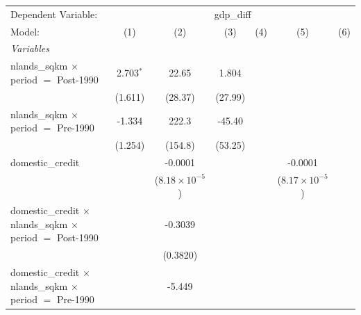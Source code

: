 \begingroup
\centering
\begin{tabular}{lcccccc}
   \tabularnewline \midrule \midrule
   Dependent Variable: & \multicolumn{6}{c}{gdp\_diff}\\
   Model:                                                                                          & (1)         & (2)                     & (3)             & (4)      & (5)                     & (6)\\  
   \midrule
   \emph{Variables}\\
   nlands\_sqkm $\times$ period $=$ Post-1990                                                      & 2.703$^{*}$ & 22.65                   & 1.804           &          &                         &   \\   
                                                                                                   & (1.611)     & (28.37)                 & (27.99)         &          &                         &   \\   
   nlands\_sqkm $\times$ period $=$ Pre-1990                                                       & -1.334      & 222.3                   & -45.40          &          &                         &   \\   
                                                                                                   & (1.254)     & (154.8)                 & (53.25)         &          &                         &   \\   
   domestic\_credit                                                                                &             & -0.0001                 &                 &          & -0.0001                 &   \\   
                                                                                                   &             & ($8.18\times 10^{-5}$)  &                 &          & ($8.17\times 10^{-5}$)  &   \\   
   domestic\_credit $\times$ nlands\_sqkm $\times$ period $=$ Post-1990                            &             & -0.3039                 &                 &          &                         &   \\   
                                                                                                   &             & (0.3820)                &                 &          &                         &   \\   
   domestic\_credit $\times$ nlands\_sqkm $\times$ period $=$ Pre-1990                             &             & -5.449                  &                 &          &                         &   \\   

\end{tabular}
